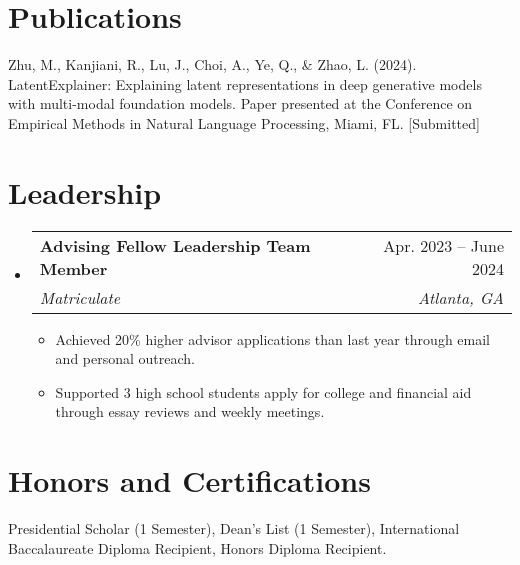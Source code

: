 \documentclass[letterpaper,11pt]{article}
\makeatletter
\newcommand{\resumeItem}[1]{
  \item\small{
    {#1 \vspace{-2pt}}
  }
}
\newcommand{\resumeSubheading}[4]{
  \vspace{-2pt}\item
    \begin{tabular*}{0.97\textwidth}[t]{l@{\extracolsep{\fill}}r}
      \textbf{#1} & #2 \\
      \textit{\small#3} & \textit{\small #4} \\
    \end{tabular*}\vspace{-7pt}
}
\newcommand{\resumeSubHeadingListStart}{\begin{itemize}[leftmargin=0.15in, label={}]}
\newcommand{\resumeSubHeadingListEnd}{\end{itemize}}
\newcommand{\resumeItemListStart}{\begin{itemize}}
\newcommand{\resumeItemListEnd}{\end{itemize}\vspace{-5pt}}
\makeatother
\begin{document}
    
\section{Publications}
    \resumeSubHeadingListStart
    \small{\item{
     \textbf{}{Zhu, M., Kanjiani, R., Lu, J., Choi, A., Ye, Q., \& Zhao, L. (2024). LatentExplainer: Explaining latent representations in deep generative models with multi-modal foundation models. Paper presented at the Conference on Empirical Methods in Natural Language Processing, Miami, FL. [Submitted]}
    }}
    \resumeSubHeadingListEnd


\section{Leadership}
  \resumeSubHeadingListStart
    \resumeSubheading
      {Advising Fellow Leadership Team Member}{Apr. 2023 -- June 2024}
      {Matriculate}{Atlanta, GA}
      \resumeItemListStart
        \resumeItem{Achieved 20\% higher advisor applications than last year through email and personal outreach.}
        \resumeItem{Supported 3 high school students apply for college and financial aid through essay reviews and weekly meetings.}
      \resumeItemListEnd
  \resumeSubHeadingListEnd

%
\section{Honors and Certifications}
 \begin{itemize}[leftmargin=0.15in, label={}]
    \small{\item{
     \textbf{}{Presidential Scholar (1 Semester), Dean’s List (1 Semester), International Baccalaureate Diploma Recipient, Honors Diploma Recipient.} \\
    }}
 \end{itemize}


\end{document}
